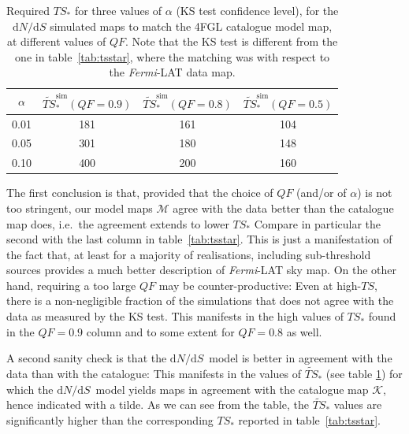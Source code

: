\documentclass{article}
\def\dNdS{\textrm{d}N/\textrm{d}S}
\newcommand{\Fermi}{\textit{Fermi}}
\begin{document}
\begin{table}[!h]
    \renewcommand{\arraystretch}{1.2}
    \centering
    \begin{tabular}{c|c|c|c}   
        $\alpha$ & $\widetilde{TS}_*^\textrm{sim}(QF=0.9)$& $\widetilde{TS}_*^\textrm{sim}(QF=0.8)$& $\widetilde{TS}_*^\textrm{sim}(QF=0.5)$\\
        \hline 
       0.01  & 181 & 161 & 104 \\ 
        \hline 
       0.05  & 301 & 180 &  148\\ 
        \hline 
       0.10  & 400 & 200 &  160\\
    \end{tabular}
\caption{Required $TS_*$ for three values of $\alpha$ (KS test confidence level), for the $\dNdS$ simulated maps to match the 4FGL catalogue model map, at different values of $QF$. Note that the KS test is different from the one in table~\ref{tab:tsstar}, where the matching was with respect to the \Fermi-LAT data map.}  
\label{tab:ts4FGL}
\end{table}
The first conclusion is that, provided that the choice of $QF$ (and/or  of $\alpha$) is not too stringent, 
 our model maps $\mathcal{M}$ agree with the data better than the catalogue map does, i.e.~the agreement extends to lower $TS_*$\: Compare in particular the second with the last column in table~\ref{tab:tsstar}. This is just a manifestation of the fact that, at least for a majority of realisations, including sub-threshold sources provides a much better description of \Fermi-LAT sky map. On the other hand, requiring a too large $QF$ may be counter-productive: Even at high-$TS$, there is a non-negligible fraction of the simulations that does not agree with the data as measured by the KS test.  This manifests in the high values of $TS_*$ found in the $QF=0.9$ column and to some extent for $QF=0.8$ as well.
%

A second sanity check is that  the $\dNdS$~model is better in agreement with the data than with the catalogue: This manifests in the values of $\widetilde{TS}_*$ (see table \ref{tab:ts4FGL}) for which the $\dNdS$~model yields maps in agreement  with the catalogue map $\mathcal{K}$, hence indicated with a tilde. As we can see from the table, the $\widetilde{TS}_*$ values are significantly higher than the corresponding $TS_*$ reported in table~\ref{tab:tsstar}.
\end{document}
